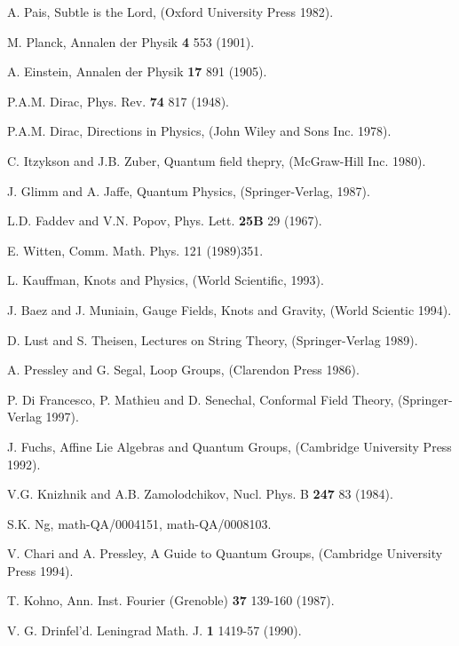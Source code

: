 \documentclass[a4paper,a4paper]{article}
\begin{document}
\begin{thebibliography}{38}

A. Pais, Subtle is the Lord, (Oxford University Press 1982).

M. Planck, Annalen der Physik {\bf 4} 553 (1901).

A. Einstein, Annalen der Physik {\bf 17} 891 (1905).

P.A.M. Dirac, Phys. Rev. {\bf 74} 817 (1948).

P.A.M. Dirac, Directions in Physics, (John Wiley and Sons Inc. 1978).

C. Itzykson and J.B. Zuber,
Quantum field thepry, (McGraw-Hill Inc. 1980).

J. Glimm and A. Jaffe,
Quantum Physics,
(Springer-Verlag, 1987).

L.D. Faddev and V.N. Popov,
Phys. Lett. {\bf 25B} 29 (1967).

E. Witten,
Comm. Math. Phys. 121 (1989)351.

L. Kauffman,
Knots and Physics,
(World Scientific, 1993).


J. Baez and J. Muniain, 
Gauge Fields, Knots and Gravity,
(World Scientic 1994).

D. Lust and S. Theisen,
Lectures on String Theory,
(Springer-Verlag 1989).

A. Pressley and G. Segal,
Loop Groups,
(Clarendon Press 1986).


P. Di Francesco, P. Mathieu and D. Senechal,
Conformal Field Theory,
(Springer-Verlag 1997).

J. Fuchs, 
Affine Lie Algebras and Quantum Groups,
(Cambridge University Press 1992).

V.G. Knizhnik and A.B. Zamolodchikov,
Nucl. Phys. B {\bf 247} 83 (1984).

 S.K. Ng,
math-QA/0004151, math-QA/0008103.


V. Chari and A. Pressley,
A Guide to Quantum Groups,
(Cambridge University Press 1994).

T. Kohno,
Ann. Inst. Fourier (Grenoble) {\bf 37}  139-160 (1987).

V. G. Drinfel'd.
Leningrad Math. J. {\bf 1}  1419-57 (1990).


\end{thebibliography}
\end{document}
